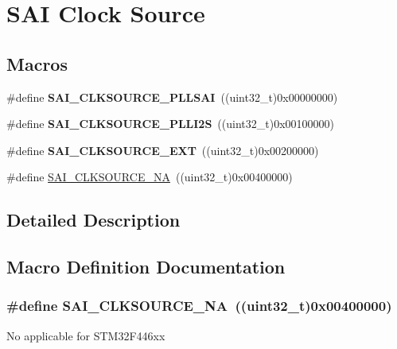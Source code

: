\hypertarget{group___s_a_i___clock___source}{}\section{S\+AI Clock Source}
\label{group___s_a_i___clock___source}
\subsection*{Macros}
\begin{DoxyCompactItemize}
\item 
\#define {\bfseries S\+A\+I\+\_\+\+C\+L\+K\+S\+O\+U\+R\+C\+E\+\_\+\+P\+L\+L\+S\+AI}~((uint32\+\_\+t)0x00000000)\hypertarget{group___s_a_i___clock___source_ga7ba150794862745f9d08e441d671e0fb}{}\label{group___s_a_i___clock___source_ga7ba150794862745f9d08e441d671e0fb}

\item 
\#define {\bfseries S\+A\+I\+\_\+\+C\+L\+K\+S\+O\+U\+R\+C\+E\+\_\+\+P\+L\+L\+I2S}~((uint32\+\_\+t)0x00100000)\hypertarget{group___s_a_i___clock___source_ga64280a4fbb876b992c732f0f96bc9158}{}\label{group___s_a_i___clock___source_ga64280a4fbb876b992c732f0f96bc9158}

\item 
\#define {\bfseries S\+A\+I\+\_\+\+C\+L\+K\+S\+O\+U\+R\+C\+E\+\_\+\+E\+XT}~((uint32\+\_\+t)0x00200000)\hypertarget{group___s_a_i___clock___source_gad81de768beae428de3f887b86f234a27}{}\label{group___s_a_i___clock___source_gad81de768beae428de3f887b86f234a27}

\item 
\#define \hyperlink{group___s_a_i___clock___source_ga30670da18cb992b42e889e7069d953c7}{S\+A\+I\+\_\+\+C\+L\+K\+S\+O\+U\+R\+C\+E\+\_\+\+NA}~((uint32\+\_\+t)0x00400000)
\end{DoxyCompactItemize}


\subsection{Detailed Description}


\subsection{Macro Definition Documentation}
\subsubsection[{\texorpdfstring{S\+A\+I\+\_\+\+C\+L\+K\+S\+O\+U\+R\+C\+E\+\_\+\+NA}{SAI_CLKSOURCE_NA}}]{\setlength{\rightskip}{0pt plus 5cm}\#define S\+A\+I\+\_\+\+C\+L\+K\+S\+O\+U\+R\+C\+E\+\_\+\+NA~((uint32\+\_\+t)0x00400000)}\hypertarget{group___s_a_i___clock___source_ga30670da18cb992b42e889e7069d953c7}{}\label{group___s_a_i___clock___source_ga30670da18cb992b42e889e7069d953c7}
No applicable for S\+T\+M32\+F446xx 